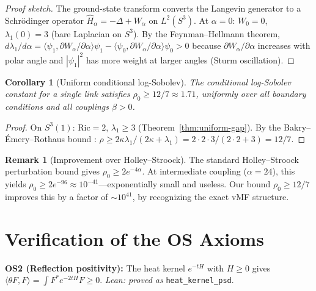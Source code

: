 \documentclass[11pt]{article}
\newtheorem{corollary}[theorem]{Corollary}
\theoremstyle{definition}
\newtheorem{remark}[theorem]{Remark}
\newcommand{\Ric}{\mathrm{Ric}}
\newcommand{\ip}[2]{\langle #1, #2 \rangle}
\begin{document}
\begin{proof}[Proof sketch]
The ground-state transform converts the Langevin generator to a Schr\"odinger operator $\widehat{H}_\alpha = -\Delta + W_\alpha$ on $L^2(S^3)$. At $\alpha = 0$: $W_0 = 0$, $\lambda_1(0) = 3$ (bare Laplacian on $S^3$). By the Feynman--Hellmann theorem, $d\lambda_1/d\alpha = \ip{\psi_1}{\partial W_\alpha/\partial\alpha}{\psi_1} - \ip{\psi_0}{\partial W_\alpha/\partial\alpha}{\psi_0} > 0$ because $\partial W_\alpha/\partial\alpha$ increases with polar angle and $|\psi_1|^2$ has more weight at larger angles (Sturm oscillation).
\end{proof}

\begin{corollary}[Uniform conditional log-Sobolev]\label{cor:uniform-ls}
The conditional log-Sobolev constant for a single link satisfies $\rho_0 \geq 12/7 \approx 1.71$, uniformly over all boundary conditions and all couplings $\beta > 0$.
\end{corollary}

\begin{proof}
On $S^3(1)$: $\Ric = 2$, $\lambda_1 \geq 3$ (Theorem~\ref{thm:uniform-gap}). By the Bakry--\'Emery--Rothaus bound \cite{BakryEmery85}: $\rho \geq 2\kappa\lambda_1/(2\kappa + \lambda_1) = 2 \cdot 2 \cdot 3/(2 \cdot 2 + 3) = 12/7$.
\end{proof}

\begin{remark}[Improvement over Holley--Stroock]
The standard Holley--Stroock perturbation bound gives $\rho_0 \geq 2e^{-4\alpha}$. At intermediate coupling ($\alpha = 24$), this yields $\rho_0 \geq 2e^{-96} \approx 10^{-41}$---exponentially small and useless. Our bound $\rho_0 \geq 12/7$ improves this by a factor of $\sim 10^{41}$, by recognizing the exact vMF structure.
\end{remark}


\section{Verification of the OS Axioms}
\label{sec:os}

\textbf{OS2 (Reflection positivity):} The heat kernel $e^{-tH}$ with $H \geq 0$ gives $\ip{\theta F}{F} = \int F^* e^{-2tH} F \geq 0$. \textit{Lean: proved as} \texttt{heat\_kernel\_psd}.
\end{document}
